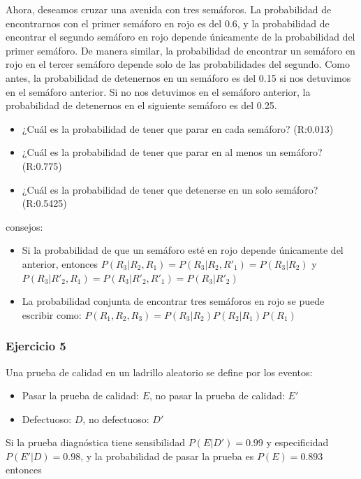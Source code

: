 \documentclass[
]{book}
\providecommand{\tightlist}{%
  \setlength{\itemsep}{0pt}\setlength{\parskip}{0pt}}
\begin{document}
Ahora, deseamos cruzar una avenida con tres semáforos. La probabilidad de encontrarnos con el primer semáforo en rojo es del 0.6, y la probabilidad de encontrar el segundo semáforo en rojo depende únicamente de la probabilidad del primer semáforo. De manera similar, la probabilidad de encontrar un semáforo en rojo en el tercer semáforo depende solo de las probabilidades del segundo. Como antes, la probabilidad de detenernos en un semáforo es del 0.15 si nos detuvimos en el semáforo anterior. Si no nos detuvimos en el semáforo anterior, la probabilidad de detenernos en el siguiente semáforo es del 0.25.

\begin{itemize}
\tightlist
\item
  ¿Cuál es la probabilidad de tener que parar en cada semáforo? (R:0.013)
\item
  ¿Cuál es la probabilidad de tener que parar en al menos un semáforo? (R:0.775)
\item
  ¿Cuál es la probabilidad de tener que detenerse en un solo semáforo? (R:0.5425)
\end{itemize}

consejos:

\begin{itemize}
\item
  Si la probabilidad de que un semáforo esté en rojo depende únicamente del anterior, entonces
  \(P(R_3|R_2,R_1)=P(R_3|R_2,R'_1)=P(R_3|R_2)\) y \(P(R_3|R'_2,R_1)=P(R_3 |R'_2,R'_1)=P(R_3|R'_2)\)
\item
  La probabilidad conjunta de encontrar tres semáforos en rojo se puede escribir como:
  \(P(R_1,R_2,R_3)=P(R_3|R_2)P(R_2|R_1)P(R_1)\)
\end{itemize}

\hypertarget{ejercicio-5}{%
\subsubsection{Ejercicio 5}\label{ejercicio-5}}

Una prueba de calidad en un ladrillo aleatorio se define por los eventos:

\begin{itemize}
\tightlist
\item
  Pasar la prueba de calidad: \(E\), no pasar la prueba de calidad: \(E'\)
\item
  Defectuoso: \(D\), no defectuoso: \(D'\)
\end{itemize}

Si la prueba diagnóstica tiene sensibilidad \(P(E|D')=0.99\) y especificidad \(P(E'|D)=0.98\), y la probabilidad de pasar la prueba es \(P(E) =0.893\) entonces
\end{document}
